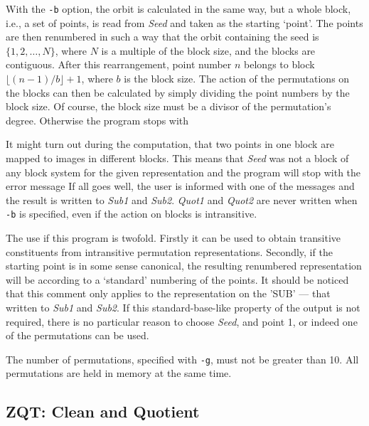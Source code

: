 With the {\tt -b} option, the orbit is calculated in the same way, but
a whole block, i.e., a set of points, is read from {\it Seed} and
taken as the starting `point'. The points are then renumbered in such
a way that the orbit containing the seed is $\{1,2,\ldots,N\}$, where
$N$ is a multiple of the block size, and the blocks are contiguous.
After this rearrangement, point number $n$ belongs to block
$\lfloor (n-1)/b\rfloor+1$, where $b$ is the block size. The action
of the permutations on the blocks can then be calculated by simply
dividing the point numbers by the block size. Of course, the block
size must be a divisor of the permutation's degree. Otherwise the
program stops with

It might turn out during the computation, that two points in one
block are mapped to images in different blocks. This means that
{\it Seed} was not a block of any block system for the given
representation and the program will stop with the error message
If all goes well, the user is informed with one of the messages
and the result is written to {\it Sub1} and {\it Sub2}. {\it Quot1}
and {\it Quot2} are never written when {\tt -b} is specified, even
if the action on blocks is intransitive.

The use if this program is twofold. Firstly it can be used to obtain
transitive constituents from intransitive permutation representations.
Secondly, if the starting point is in some sense canonical, the
resulting renumbered representation will be according to a `standard'
numbering of the points. It should be noticed that this comment only
applies to the representation on the 'SUB' --- that written to
{\it Sub1} and {\it Sub2}.
If this standard-base-like property of the
output is not required, there is no particular reason to choose
{\it Seed}, and point 1, or indeed one of the permutations can be
used.

\Limits
The number of permutations, specified with {\tt -g}, must not be greater
than 10. All permutations are held in memory at the same time.



\subsection{ZQT: Clean and Quotient}\label{sec:zqd}
\Syntax
{}

